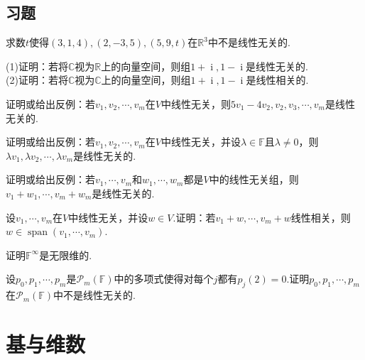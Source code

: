 \documentclass[lang=cn, zihao=5]{elegantbook}
\newcommand{\R}{\mathbb{R}}
\newcommand{\C}{\mathbb{C}}
\newcommand{\F}{\mathbb{F}}
\DeclareMathOperator{\spn}{span}
\DeclareMathOperator{\ic}{i}
\begin{document}
\subsection*{习题}

\begin{exercise}
	求数$t$使得$(3,1,4),(2,-3,5),(5,9,t)$在$\R ^{3}$中不是线性无关的.
\end{exercise}

\begin{exercise}
	(1)证明：若将$\C$视为$\R$上的向量空间，则组$1+\ic ,1-\ic $是线性无关的. \\
	(2)证明：若将$\C$视为$\C$上的向量空间，则组$1+\ic ,1-\ic $是线性相关的.
\end{exercise}

\begin{exercise}
	证明或给出反例：若$v_1,v_2, \cdots ,v_m$在$V$中线性无关，则$5v_1-4v_2,v_2,v_3, \cdots ,v_m$是线性无关的.
\end{exercise}

\begin{exercise}
	证明或给出反例：若$v_1,v_2, \cdots ,v_m$在$V$中线性无关，并设$\lambda \in \F$且$\lambda \neq 0$，则$\lambda v_1,\lambda v_2,\cdots ,\lambda v_m$是线性无关的.
\end{exercise}

\begin{exercise}
	证明或给出反例：若$v_1, \cdots ,v_m$和$w_1,\cdots ,w_m$都是$V$中的线性无关组，则$v_1+w_1, \cdots ,v_m+w_m$是线性无关的.
\end{exercise}

\begin{exercise}
	设$v_1, \cdots ,v_m$在$V$中线性无关，并设$w \in V$.证明：若$v_1+w, \cdots ,v_m+w$线性相关，则$w \in \spn (v_1, \cdots ,v_m)$.
\end{exercise}

\begin{exercise}
	证明$\F ^{\infty}$是无限维的.
\end{exercise}

\begin{exercise}
	设$p_0,p_1, \cdots ,p_m$是$\mathcal{P}_m (\F)$中的多项式使得对每个$j$都有$p_{j}(2)=0$.证明$p_0,p_1, \cdots ,p_m$在$\mathcal{P}_m (\F)$中不是线性无关的.
\end{exercise}

\newpage
\section{基与维数}
\end{document}
